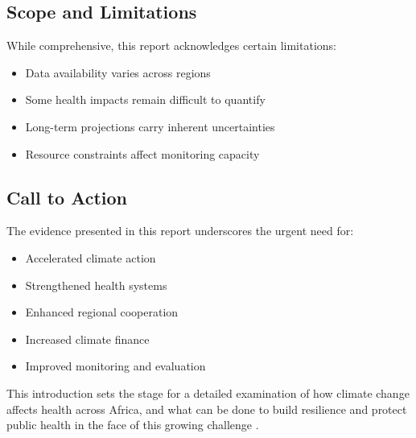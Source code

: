 \subsection{Scope and Limitations}
While comprehensive, this report acknowledges certain limitations:

\begin{itemize}
    \item Data availability varies across regions
    \item Some health impacts remain difficult to quantify
    \item Long-term projections carry inherent uncertainties
    \item Resource constraints affect monitoring capacity
\end{itemize}

\subsection{Call to Action}
The evidence presented in this report underscores the urgent need for:

\begin{itemize}
    \item Accelerated climate action
    \item Strengthened health systems
    \item Enhanced regional cooperation
    \item Increased climate finance
    \item Improved monitoring and evaluation
\end{itemize}

This introduction sets the stage for a detailed examination of how climate change affects health across Africa, and what can be done to build resilience and protect public health in the face of this growing challenge \citep{unep2024}.
